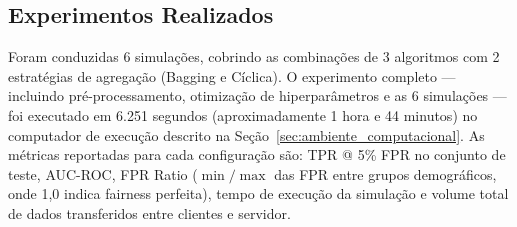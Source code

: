 \subsection{Experimentos Realizados}

Foram conduzidas 6 simulações, cobrindo as combinações de 3 algoritmos com 2 estratégias de agregação (Bagging e Cíclica). O experimento completo --- incluindo pré-processamento, otimização de hiperparâmetros e as 6 simulações --- foi executado em 6.251 segundos (aproximadamente 1 hora e 44 minutos) no computador de execução descrito na Seção~\ref{sec:ambiente_computacional}. As métricas reportadas para cada configuração são: TPR @ 5\% FPR no conjunto de teste, AUC-ROC, FPR Ratio ($\min/\max$ das FPR entre grupos demográficos, onde 1,0 indica fairness perfeita), tempo de execução da simulação e volume total de dados transferidos entre clientes e servidor.
